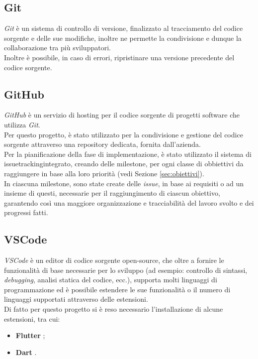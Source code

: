 \subsection*{Git}
\label{subsec:git}

\emph{Git} \cite{site:git} è un sistema di controllo di versione, finalizzato al tracciamento del codice sorgente e delle sue modifiche, inoltre ne permette la condivisione e dunque la collaborazione tra più sviluppatori.\\
Inoltre è possibile, in caso di errori, ripristinare una versione precedente del codice sorgente.

\subsection*{GitHub}
\label{subsec:github}

\emph{GitHub} \cite{site:github} è un servizio di hosting per il codice sorgente di progetti software che utilizza \emph{Git}.\\
Per questo progetto, è stato utilizzato per la condivisione e gestione del codice sorgente attraverso una repository dedicata, fornita dall'azienda.\\
Per la pianificazione della fase di implementazione, è stato utilizzato il sistema di \gls{issuetracking}\glsoccur integrato, creando delle \gls{milestone}\glsoccur, per ogni classe di obbiettivi da raggiungere in base alla loro priorità (vedi Sezione \ref{sec:obiettivi}).\\
In ciascuna \gls{milestone}\glsoccur, sono state create delle \emph{issue}, in base ai requisiti o ad un insieme di questi, necessarie per il raggiungimento di ciascun obiettivo, garantendo così una maggiore organizzazione e tracciabilità del lavoro svolto e dei progressi fatti.

\subsection*{VSCode}
\label{subsec:vscode}

\emph{VSCode} è un editor di codice sorgente \gls{open-source}\glsoccur, che oltre a fornire le funzionalità di base necessarie per lo sviluppo (ad esempio: controllo di sintassi, \emph{debugging}, analisi statica del codice, ecc.), supporta molti linguaggi di programmazione ed è possibile estendere le sue funzionalità o il numero di linguaggi supportati attraverso delle estensioni.\\
Di fatto per questo progetto si è reso necessario l'installazione di alcune estensioni, tra cui:
\begin{itemize}
    \item \textbf{Flutter} \cite{site:flutter-extension};
    \item \textbf{Dart} \cite{site:dart-extension}.
\end{itemize}

